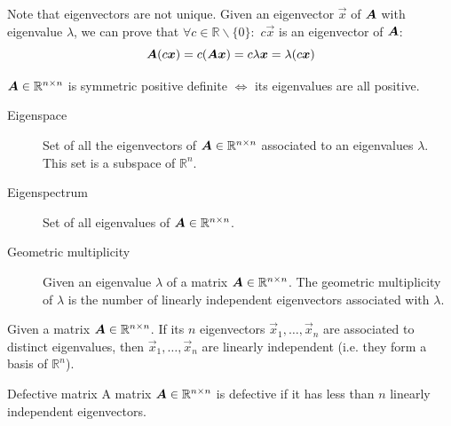 Note that eigenvectors are not unique.
Given an eigenvector $\vec{x}$ of ${\bm{A}}$ with eigenvalue $\lambda$, 
we can prove that $\forall c \in \mathbb{R} \smallsetminus \{0\}:$ $c\vec{x}$ is an eigenvector of ${\bm{A}}$:
\[ {\bm{A}}(c{\bm{x}}) = c({\bm{A}}{\bm{x}}) = c\lambda{\bm{x}} = \lambda(c{\bm{x}}) \]


\begin{theorem} 
    ${\bm{A}} \in \mathbb{R}^{n \times n}$ is symmetric positive definite $\iff$
    its eigenvalues are all positive.
\end{theorem}

\begin{description}
    \item[Eigenspace] 
        Set of all the eigenvectors of ${\bm{A}} \in \mathbb{R}^{n \times n}$ associated to an eigenvalues $\lambda$.
        This set is a subspace of $\mathbb{R}^n$.
    
    \item[Eigenspectrum] 
        Set of all eigenvalues of ${\bm{A}} \in \mathbb{R}^{n \times n}$.
\end{description}


\begin{description}
    \item[Geometric multiplicity] 
        Given an eigenvalue $\lambda$ of a matrix ${\bm{A}} \in \mathbb{R}^{n \times n}$.
        The geometric multiplicity of $\lambda$ is the number of linearly independent eigenvectors associated with $\lambda$.
\end{description}


\begin{theorem} 
    Given a matrix ${\bm{A}} \in \mathbb{R}^{n \times n}$. 
    If its $n$ eigenvectors $\vec{x}_1, \dots, \vec{x}_n$ are associated to distinct eigenvalues, 
    then $\vec{x}_1, \dots, \vec{x}_n$ are linearly independent (i.e. they form a basis of $\mathbb{R}^n$).

    \begin{descriptionlist}
        \item[Defective matrix] 
            A matrix ${\bm{A}} \in \mathbb{R}^{n \times n}$ is defective if it has less than $n$ linearly independent eigenvectors.
    \end{descriptionlist}
\end{theorem}


